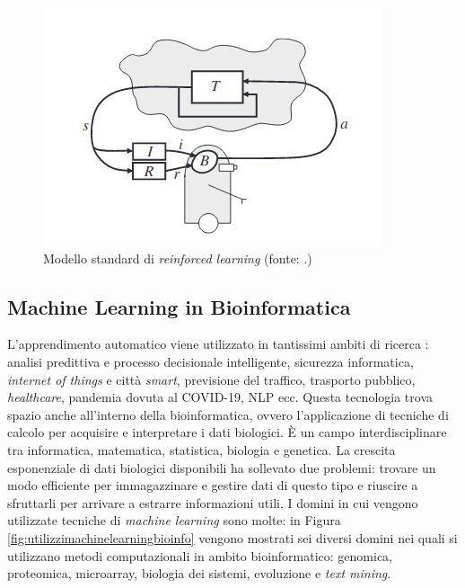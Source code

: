 \documentclass[12pt,italian]{report}
\begin{document}
	\begin{figure}[h]
		\centering
		\includegraphics[width=0.7\linewidth]{immagini/ReinforcedLearningModel}
		\caption{Modello standard di \textit{reinforced learning} (fonte: \cite{kaelbling1996reinforcement}.)}
		\label{fig:reinforcedlearningmodel}
	\end{figure}
	
	
	\subsection{Machine Learning in Bioinformatica}
	L'apprendimento automatico viene utilizzato in tantissimi ambiti di ricerca \cite{Sarker2021}: analisi predittiva e processo decisionale intelligente, sicurezza informatica, \textit{internet of things} e città \textit{smart}, previsione del traffico, trasporto pubblico, \textit{healthcare}, pandemia dovuta al COVID-19, NLP ecc.
	Questa tecnologia trova spazio anche all'interno della bioinformatica, ovvero l'applicazione di tecniche di calcolo per acquisire e interpretare i dati biologici. È un campo interdisciplinare tra informatica, matematica, statistica, biologia e genetica. 	
	La crescita esponenziale di dati biologici disponibili ha sollevato due problemi: trovare un modo efficiente per immagazzinare e gestire dati di questo tipo e riuscire a sfruttarli per arrivare a estrarre informazioni utili. I domini in cui vengono utilizzate tecniche di \textit{machine learning} sono molte: in Figura \ref{fig:utilizzimachinelearningbioinfo} vengono mostrati sei diversi domini nei quali si utilizzano metodi computazionali in ambito bioinformatico: genomica, proteomica, microarray, biologia dei sistemi, evoluzione e \textit{text mining}.
	
\end{document}
